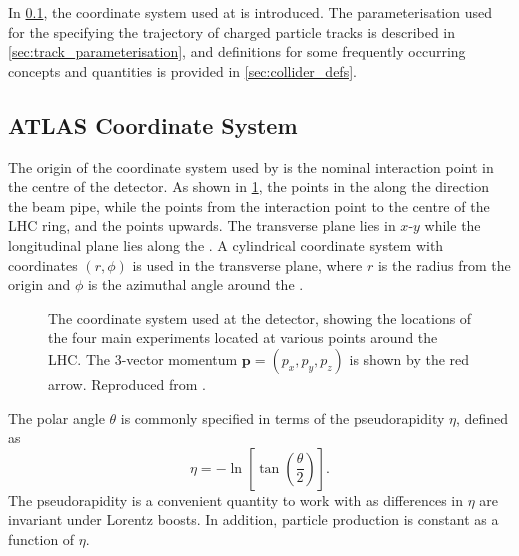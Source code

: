 In \cref{sec:coord_sys}, the coordinate system used at \ATLAS is introduced.
The parameterisation used for the specifying the trajectory of charged particle tracks is described in \cref{sec:track_parameterisation}, and definitions for some frequently occurring concepts and quantities is provided in \cref{sec:collider_defs}.

\subsection{ATLAS Coordinate System}\label{sec:coord_sys}


The origin of the coordinate system used by \ATLAS is the nominal interaction point in the centre of the detector.
As shown in \cref{fig:atlas_coord_system}, the  points in the along the direction the beam pipe, while the  points from the interaction point to the centre of the LHC ring, and the  points upwards.
The transverse plane lies in $x$\nobreakdash-$y$ while the longitudinal plane lies along the .
A cylindrical coordinate system with coordinates $(r,\phi)$ is used in the transverse plane, where $r$ is the radius from the origin and $\phi$ is the azimuthal angle around the .

\begin{figure}[!htbp]
  \centering
  
  \caption{
    The coordinate system used at the \ATLAS detector, showing the locations of the four main experiments located at various points around the LHC.
    The 3-vector momentum $\bm{p} = (p_x, p_y, p_z)$ is shown by the red arrow.
    Reproduced from .
  }
  \label{fig:atlas_coord_system}
\end{figure}



The polar angle $\theta$ is commonly specified in terms of the pseudorapidity $\eta$, defined as
%
\begin{equation}\label{eq:pseudorap}
  \eta = - \ln \left[ \tan \left( \frac{\theta}{2} \right) \right] .
\end{equation}
%
The pseudorapidity is a convenient quantity to work with as differences in $\eta$ are invariant under Lorentz boosts.
In addition, particle production is constant as a function of $\eta$.

